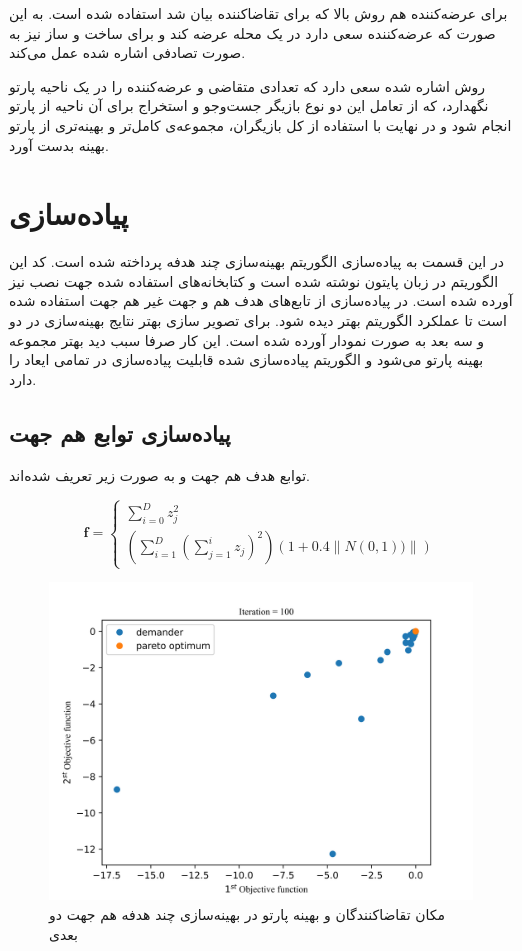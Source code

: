 برای عرضه‌کننده هم روش بالا که برای تقاضاکننده بیان شد استفاده شده است. به این صورت که عرضه‌کننده سعی دارد در یک محله عرضه کند و برای ساخت و ساز نیز به صورت تصادفی اشاره شده عمل می‌کند.
 
 
 روش اشاره شده سعی دارد که تعدادی متقاضی و عرضه‌کننده را در یک ناحیه پارتو نگهدارد، که از تعامل این دو نوع بازیگر جست‌وجو و استخراج برای آن ناحیه از پارتو انجام شود و در نهایت با استفاده از کل بازیگران، مجموعه‌ی کامل‌تر و بهینه‌تری از پارتو بهینه بدست آورد.
 
 \section{پیاده‌سازی}
 در این قسمت به پیاده‌سازی الگوریتم بهینه‌سازی چند هدفه پرداخته شده است. کد این الگوریتم در زبان پایتون
 نوشته شده است و کتابخانه‌های استفاده شده جهت نصب نیز آورده شده است. در پیاده‌سازی از تابع‌های هدف هم و جهت‌ غیر هم جهت استفاده شده است تا عملکرد الگوریتم بهتر دیده شود.
 برای تصویر سازی بهتر نتایج بهینه‌سازی در دو و سه بعد به صورت نمودار آورده شده است. این کار صرفا سبب دید بهتر مجموعه بهینه پارتو می‌شود و الگوریتم پیاده‌سازی شده قابلیت پیاده‌سازی در تمامی ایعاد را دارد.
 
\subsection{پیاده‌سازی توابع هم جهت}
 توابع هدف هم جهت و به صورت زیر تعریف شده‌اند.
 
\begin{equation}
	\boldsymbol{f} = 
	\begin{cases}
		\sum_{i=0}^{D}z_j^2 \\
		\left(\sum_{i=1}^{D}\left(\sum_{j=1}^{i}z_j\right)^2\right)(1+0.4\left\|N(0, 1))\right\|) 
	\end{cases}
\end{equation}


\begin{figure}[H]
	\includegraphics[width=16cm]{../Figure/results/cooperative_2d.png}
	\centering
	\caption{مکان تقاضا‌کنندگان و بهینه پارتو در بهینه‌سازی چند هدفه هم جهت دو بعدی}
\end{figure}


